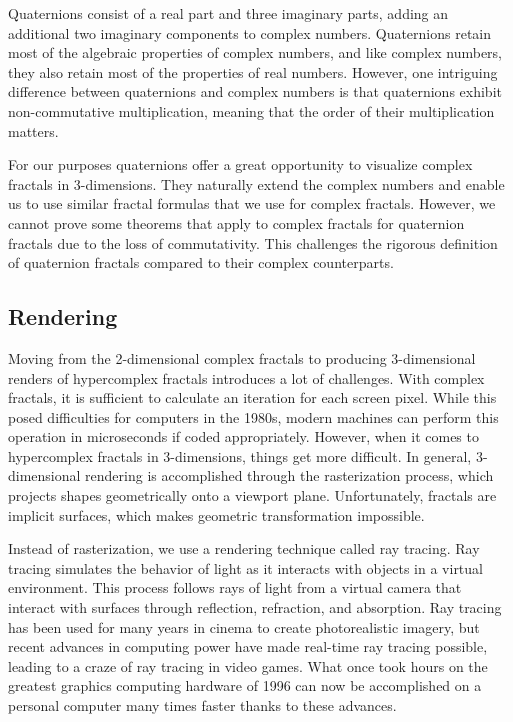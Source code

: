 \documentclass[11pt,hidelinks]{article}
\numberwithin{equation}{section} %
\theoremstyle{bf}
\theoremstyle{indentbf}
\begin{document}
Quaternions consist of a real part and three imaginary parts, adding an additional two imaginary components to complex numbers. Quaternions retain most of the algebraic properties of complex numbers, and like complex numbers, they also retain most of the properties of real numbers. However, one intriguing difference between quaternions and complex numbers is that quaternions exhibit non-commutative multiplication, meaning that the order of their multiplication matters.

For our purposes quaternions offer a great opportunity to visualize complex fractals in 3-dimensions. They naturally extend the complex numbers and enable us to use similar fractal formulas that we use for complex fractals. However, we cannot prove some theorems that apply to complex fractals for quaternion fractals due to the loss of commutativity. This challenges the rigorous definition of quaternion fractals compared to their complex counterparts.

\subsection{Rendering}
\label{sec:org7e95375}

Moving from the 2-dimensional complex fractals to producing 3-dimensional renders of hypercomplex fractals introduces a lot of challenges. With complex fractals, it is sufficient to calculate an iteration for each screen pixel. While this posed difficulties for computers in the 1980s, modern machines can perform this operation in microseconds if coded appropriately. However, when it comes to hypercomplex fractals in 3-dimensions, things get more difficult. In general, 3-dimensional  rendering is accomplished through the rasterization process, which projects shapes geometrically onto a viewport plane. Unfortunately, fractals are implicit surfaces, which makes geometric transformation impossible.

Instead of rasterization, we use a rendering technique called ray tracing. Ray tracing simulates the behavior of light as it interacts with objects in a virtual environment. This process follows rays of light from a virtual camera that interact with surfaces through reflection, refraction, and absorption. Ray tracing has been used for many years in cinema to create photorealistic imagery, but recent advances in computing power have made real-time ray tracing possible, leading to a craze of ray tracing in video games. What once took hours on the greatest graphics computing hardware of 1996 can now be accomplished on a personal computer many times faster thanks to these advances.
\end{document}
